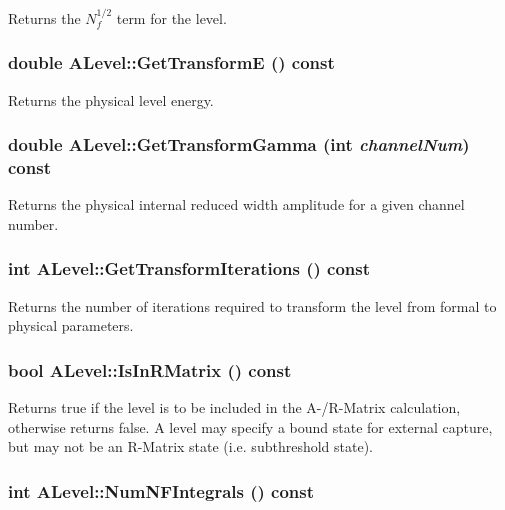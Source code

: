 Returns the $N_f^{1/2}$ term for the level. 
\subsubsection{\setlength{\rightskip}{0pt plus 5cm}double ALevel::Get\-Transform\-E () const}\label{classALevel_9a0e4a0e05a1db6898ed7cb0233fe969}


Returns the physical level energy. 
\subsubsection{\setlength{\rightskip}{0pt plus 5cm}double ALevel::Get\-Transform\-Gamma (int {\em channel\-Num}) const}\label{classALevel_9db61f904cf1dee62de0e84d211d07ca}


Returns the physical internal reduced width amplitude for a given channel number. 
\subsubsection{\setlength{\rightskip}{0pt plus 5cm}int ALevel::Get\-Transform\-Iterations () const}\label{classALevel_61023b8c28d5b6d219ca6a1240b7f7d7}


Returns the number of iterations required to transform the level from formal to physical parameters. 
\subsubsection{\setlength{\rightskip}{0pt plus 5cm}bool ALevel::Is\-In\-RMatrix () const}\label{classALevel_676875f3240be1331290b09b6d0b207a}


Returns true if the level is to be included in the A-/R-Matrix calculation, otherwise returns false. A level may specify a bound state for external capture, but may not be an R-Matrix state (i.e. subthreshold state). 
\subsubsection{\setlength{\rightskip}{0pt plus 5cm}int ALevel::Num\-NFIntegrals () const}\label{classALevel_e1bf8431aea6b6037271219d118e3808}


